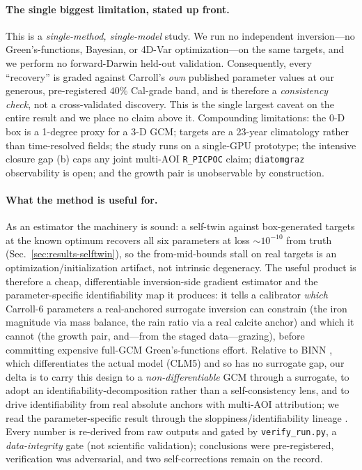 \documentclass[11pt]{article}
\begin{document}
\paragraph{The single biggest limitation, stated up front.}
This is a \emph{single-method, single-model} study. We run no independent
inversion---no Green's-functions, Bayesian, or 4D-Var \cite{heimbach2015}
optimization---on the same targets, and we perform no forward-Darwin held-out
validation. Consequently, every ``recovery'' is graded against Carroll's
\emph{own} published parameter values \cite{carroll2022} at our generous,
pre-registered $40\%$ Cal-grade band, and is therefore a \emph{consistency check},
not a cross-validated discovery. This is the single largest caveat on the entire
result and we place no claim above it. Compounding limitations: the 0-D box is a
1-degree proxy for a 3-D GCM; targets are a 23-year climatology rather than
time-resolved fields; the study runs on a single-GPU prototype; the intensive
closure gap (b) caps any joint multi-AOI \texttt{R\_PICPOC} claim;
\texttt{diatomgraz} observability is open; and the growth pair is unobservable by
construction.

\paragraph{What the method is useful for.}
As an estimator the machinery is sound: a self-twin against box-generated targets
at the known optimum recovers all six parameters at loss $\sim$$10^{-10}$ from
truth (Sec.~\ref{sec:results-selftwin}), so the from-mid-bounds stall on real
targets is an optimization/initialization artifact, not intrinsic degeneracy. The
useful product is therefore a cheap, differentiable inversion-side gradient
estimator and the parameter-specific identifiability map it produces: it tells a
calibrator \emph{which} Carroll-6 parameters a real-anchored surrogate inversion
can constrain (the iron magnitude via mass balance, the rain ratio via a real
calcite anchor) and which it cannot (the growth pair, and---from the staged
data---grazing), before committing expensive full-GCM Green's-functions effort.
Relative to BINN \cite{xu2025binn}, which differentiates the actual model (CLM5)
and so has no surrogate gap, our delta is to carry this design to a
\emph{non-differentiable} GCM through a surrogate, to adopt an
identifiability-decomposition rather than a self-consistency lens, and to drive
identifiability from real absolute anchors with multi-AOI attribution; we read the
parameter-specific result through the sloppiness/identifiability lineage
\cite{transtrum2012}. Every number is re-derived from raw outputs and gated by
\texttt{verify\_run.py}, a \emph{data-integrity} gate (not scientific validation);
conclusions were pre-registered, verification was adversarial, and two
self-corrections remain on the record.
\end{document}
